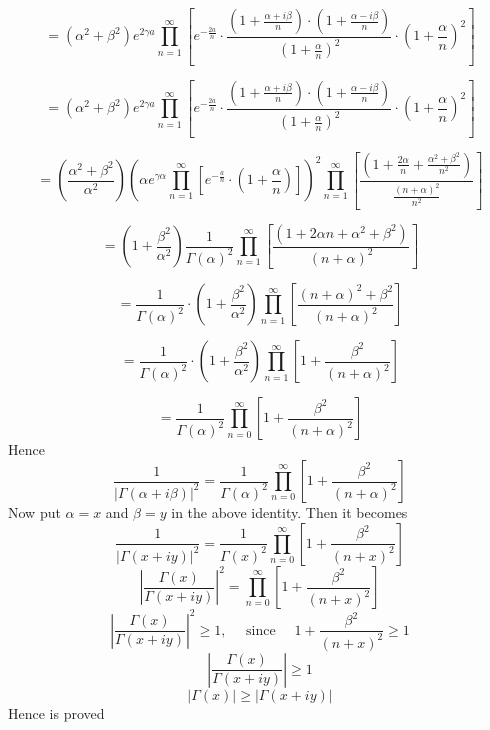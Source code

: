 \documentclass{article}
\begin{document}
\begin{flushleft}
$$
=\left(\alpha^{2}+\beta^{2}\right) e^{2 \gamma a} \prod_{n=1}^{\infty}\left[e^{-\frac{2 a}{n}} \cdot \frac{\left(1+\frac{\alpha+i \beta}{n}\right) \cdot\left(1+\frac{\alpha-i \beta}{n}\right)}{\left(1+\frac{\alpha}{n}\right)^{2}} \cdot\left(1+\frac{\alpha}{n}\right)^{2}\right]
$$

$$
=\left(\alpha^{2}+\beta^{2}\right) e^{2 \gamma a} \prod_{n=1}^{\infty}\left[e^{-\frac{2 a}{n}} \cdot \frac{\left(1+\frac{\alpha+i \beta}{n}\right) \cdot\left(1+\frac{\alpha-i \beta}{n}\right)}{\left(1+\frac{\alpha}{n}\right)^{2}} \cdot\left(1+\frac{\alpha}{n}\right)^{2}\right]
$$

$$
=\left(\frac{\alpha^{2}+\beta^{2}}{\alpha^{2}}\right)\left(\alpha e^{\gamma \alpha} \prod_{n=1}^{\infty}\left[e^{-\frac{a}{n}} \cdot\left(1+\frac{\alpha}{n}\right)\right]\right)^{2} \prod_{n=1}^{\infty}\left[\frac{\left(1+\frac{2 \alpha}{n}+\frac{\alpha^{2}+\beta^{2}}{n^{2}}\right)}{\frac{(n+\alpha)^{2}}{n^{2}}}\right]
$$


$$
=\left(1+\frac{\beta^{2}}{\alpha^{2}}\right) \frac{1}{\Gamma(\alpha)^{2}} \prod_{n=1}^{\infty}\left[\frac{\left(1+2 \alpha n+\alpha^{2}+\beta^{2}\right)}{(n+\alpha)^{2}}\right]
$$

$$
=\frac{1}{\Gamma(\alpha)^{2}} \cdot\left(1+\frac{\beta^{2}}{\alpha^{2}}\right) \prod_{n=1}^{\infty}\left[\frac{(n+\alpha)^{2}+\beta^{2}}{(n+\alpha)^{2}}\right]
$$

$$
=\frac{1}{\Gamma(\alpha)^{2}} \cdot\left(1+\frac{\beta^{2}}{\alpha^{2}}\right) \prod_{n=1}^{\infty}\left[1+\frac{\beta^{2}}{(n+\alpha)^{2}}\right]
$$

$$
=\frac{1}{\Gamma(\alpha)^{2}} \prod_{n=0}^{\infty}\left[1+\frac{\beta^{2}}{(n+\alpha)^{2}}\right]
$$
Hence
$$
\frac{1}{|\Gamma(\alpha+i \beta)|^{2}}=\frac{1}{\Gamma(\alpha)^{2}} \prod_{n=0}^{\infty}\left[1+\frac{\beta^{2}}{(n+\alpha)^{2}}\right]
$$
Now put $\alpha=x$ and $\beta=y$ in the above identity. Then it becomes
$$
\frac{1}{|\Gamma(x+i y)|^{2}}=\frac{1}{\Gamma(x)^{2}} \prod_{n=0}^{\infty}\left[1+\frac{\beta^{2}}{(n+x)^{2}}\right]
$$
$$
\left|\frac{\Gamma(x)}{\Gamma(x+i y)}\right|^{2}=\prod_{n=0}^{\infty}\left[1+\frac{\beta^{2}}{(n+x)^{2}}\right]
$$
$$
\left|\frac{\Gamma(x)}{\Gamma(x+i y)}\right|^{2} \geq 1, \quad \text { since }\quad 1+\frac{\beta^{2}}{(n+x)^{2}} \geq 1
$$
$$\left|\frac{\Gamma(x)}{\Gamma(x+i y)}\right| \geq 1$$
$$|\Gamma(x)| \geq|\Gamma(x+i y)|$$
Hence is proved






\newpage


\end{flushleft}
\end{document}
